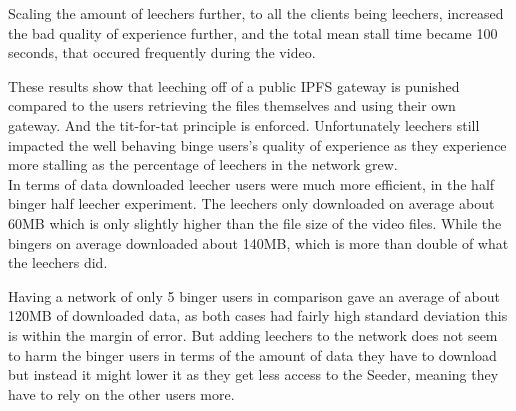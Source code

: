 




%

Scaling the amount of leechers further, to all the clients being leechers, increased the bad quality of experience further, and the total mean stall time became 100 seconds, that occured frequently during the video.

These results show that leeching off of a public \acs{IPFS} gateway is punished compared to the users retrieving the files themselves and using their own gateway. And the tit-for-tat principle is enforced. Unfortunately leechers still impacted the well behaving binge users's quality of experience as they experience more stalling as the percentage of leechers in the network grew.\\
In terms of data downloaded leecher users were much more efficient, in the half binger half leecher experiment. The leechers only downloaded on average about 60\acs{MB} which is only slightly higher than the file size of the video files. While the bingers on average downloaded about 140\acs{MB}, which is more than double of what the leechers did. 


Having a network of only 5 binger users in comparison gave an average of about 120\acs{MB} of downloaded data, as both cases had fairly high standard deviation this is within the margin of error. But adding leechers to the network does not seem to harm the binger users in terms of the amount of data they have to download but instead it might lower it as they get less access to the Seeder, meaning they have to rely on the other users more.

